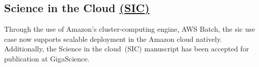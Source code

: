 \documentclass[simplex.tex]{subfiles}
\begin{document}
\subsection[Science in the Cloud]{Science in the Cloud \href{http://scienceinthe.cloud}{(SIC)}}

Through the use of Amazon's cluster-computing engine, AWS Batch, the sic use case now supports scalable deployment in
the Amazon cloud natively. Additionally, the Science in the cloud~(SIC) manuscript has been accepted for publication at
GigaScience.
\end{document}
